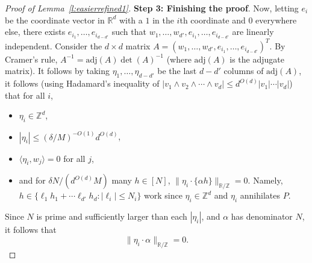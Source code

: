 \documentclass[11pt, a4paper]{amsart}
\theoremstyle{plain}
\theoremstyle{plain}
\theoremstyle{definition}
\theoremstyle{remark}
\numberwithin{equation}{section}
\numberwithin{lemma}{section}
\numberwithin{proposition}{section}
\numberwithin{corollary}{section}
\numberwithin{definition}{section}
\numberwithin{claim}{section}
\begin{document}
\begin{proof}[Proof of Lemma~\ref{l:easierrefined1}]
\textbf{Step 3: Finishing the proof}. Now, letting $e_i$ be the coordinate vector in $\mathbb{R}^{d}$ with a $1$ in the $i$th coordinate and $0$ everywhere else, there exists $e_{i_1}, \dots, e_{i_{d - d'}}$ such that $w_1, \dots, w_{d'}, e_{i_1}, \dots, e_{i_{d - d'}}$ are linearly independent. Consider the $d \times d$ matrix $A = (w_1, \dots, w_{d'}, e_{i_1}, \dots, e_{i_{d - d'}})^{T}$. By Cramer's rule, $A^{-1} = \text{adj}(A)\det(A)^{-1}$ (where $\text{adj}(A)$ is the adjugate matrix). It follows by taking $\eta_1, \dots, \eta_{d - d'}$ be the last $d - d'$ columns of $\text{adj}(A)$, it follows (using Hadamard's inequality of $|v_1 \wedge v_2 \wedge \cdots \wedge v_d| \le d^{O(d)}|v_1| \cdots |v_d|$) that for all $i$,
\begin{itemize}
    \item $\eta_i \in \mathbb{Z}^d$,
    \item $|\eta_i| \le (\delta/M)^{-O(1)}d^{O(d)}$,
    \item $\langle \eta_i, w_j \rangle = 0$ for all $j$,
    \item and for $\delta N/(d^{O(d)}M)$ many $h \in [N]$,
    $\|\eta_i \cdot \{\alpha h\}\|_{\mathbb{R}/\mathbb{Z}} = 0.$
    Namely, $h\in\{\ell_1h_1+\cdots\ell_{d'}h_d:|\ell_i|\le N_i\}$ work since $\eta_i \in \mathbb{Z}^d$ and $\eta_i$ annihilates $P$.
\end{itemize}

Since $N$ is prime and sufficiently larger than each $|\eta_i|$, and $\alpha$ has denominator $N$, it follows that
$$\|\eta_i \cdot \alpha\|_{\mathbb{R}/\mathbb{Z}} = 0.$$
\end{proof}
\end{document}
